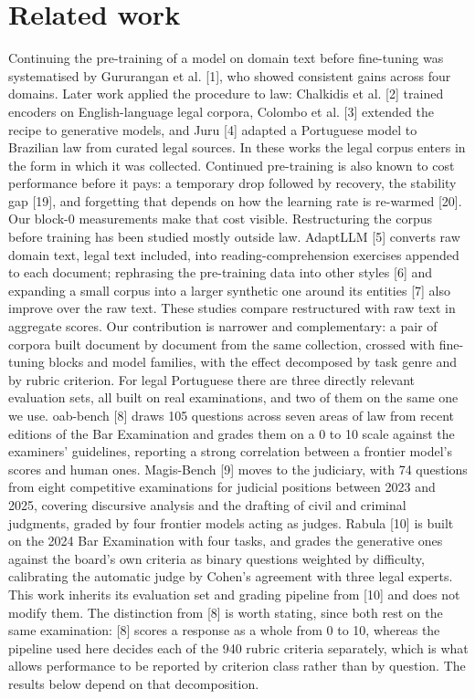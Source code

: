 \documentclass{IOS-Book-Article}
\begin{document}
\section{Related work}
Continuing the pre-training of a model on domain text before fine-tuning was systematised by Gururangan et al. [1], who showed consistent gains across four domains. Later work applied the procedure to law: Chalkidis et al. [2] trained encoders on English-language legal corpora, Colombo et al. [3] extended the recipe to generative models, and Juru [4] adapted a Portuguese model to Brazilian law from curated legal sources. In these works the legal corpus enters in the form in which it was collected. Continued pre-training is also known to cost performance before it pays: a temporary drop followed by recovery, the stability gap [19], and forgetting that depends on how the learning rate is re-warmed [20]. Our block-0 measurements make that cost visible.
Restructuring the corpus before training has been studied mostly outside law. AdaptLLM [5] converts raw domain text, legal text included, into reading-comprehension exercises appended to each document; rephrasing the pre-training data into other styles [6] and expanding a small corpus into a larger synthetic one around its entities [7] also improve over the raw text. These studies compare restructured with raw text in aggregate scores. Our contribution is narrower and complementary: a pair of corpora built document by document from the same collection, crossed with fine-tuning blocks and model families, with the effect decomposed by task genre and by rubric criterion.
For legal Portuguese there are three directly relevant evaluation sets, all built on real examinations, and two of them on the same one we use. oab-bench [8] draws 105 questions across seven areas of law from recent editions of the Bar Examination and grades them on a 0 to 10 scale against the examiners' guidelines, reporting a strong correlation between a frontier model's scores and human ones. Magis-Bench [9] moves to the judiciary, with 74 questions from eight competitive examinations for judicial positions between 2023 and 2025, covering discursive analysis and the drafting of civil and criminal judgments, graded by four frontier models acting as judges. Rabula [10] is built on the 2024 Bar Examination with four tasks, and grades the generative ones against the board's own criteria as binary questions weighted by difficulty, calibrating the automatic judge by Cohen's agreement with three legal experts.
This work inherits its evaluation set and grading pipeline from [10] and does not modify them. The distinction from [8] is worth stating, since both rest on the same examination: [8] scores a response as a whole from 0 to 10, whereas the pipeline used here decides each of the 940 rubric criteria separately, which is what allows performance to be reported by criterion class rather than by question. The results below depend on that decomposition.
\end{document}
